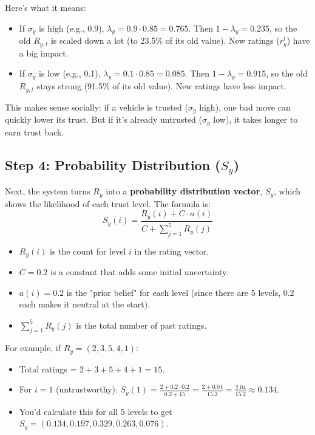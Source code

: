 \documentclass{article}
\begin{document}
Here's what it means:
\begin{itemize}
    \item If \(\sigma_y\) is high (e.g., 0.9), \(\lambda_y = 0.9 \cdot 0.85 = 0.765\). Then \(1 - \lambda_y = 0.235\), so the old \(R_{y,t}\) is scaled down a lot (to 23.5\% of its old value). New ratings (\(r_y^t\)) have a big impact.
    \item If \(\sigma_y\) is low (e.g., 0.1), \(\lambda_y = 0.1 \cdot 0.85 = 0.085\). Then \(1 - \lambda_y = 0.915\), so the old \(R_{y,t}\) stays strong (91.5\% of its old value). New ratings have less impact.
\end{itemize}

This makes sense socially: if a vehicle is trusted (\(\sigma_y\) high), one bad move can quickly lower its trust. But if it's already untrusted (\(\sigma_y\) low), it takes longer to earn trust back.

\subsection*{Step 4: Probability Distribution (\(S_y\))}
Next, the system turns \(R_y\) into a \textbf{probability distribution vector}, \(S_y\), which shows the likelihood of each trust level. The formula is:
\[
S_y(i) = \frac{R_y(i) + C \cdot a(i)}{C + \sum_{j=1}^5 R_y(j)}
\]
\begin{itemize}
    \item \(R_y(i)\) is the count for level \(i\) in the rating vector.
    \item \(C = 0.2\) is a constant that adds some initial uncertainty.
    \item \(a(i) = 0.2\) is the "prior belief" for each level (since there are 5 levels, 0.2 each makes it neutral at the start).
    \item \(\sum_{j=1}^5 R_y(j)\) is the total number of past ratings.
\end{itemize}

For example, if \(R_y = (2, 3, 5, 4, 1)\):
\begin{itemize}
    \item Total ratings = \(2 + 3 + 5 + 4 + 1 = 15\).
    \item For \(i = 1\) (untrustworthy): \( S_y(1) = \frac{2 + 0.2 \cdot 0.2}{0.2 + 15} = \frac{2 + 0.04}{15.2} = \frac{2.04}{15.2} \approx 0.134 \).
    \item You'd calculate this for all 5 levels to get \(S_y = (0.134, 0.197, 0.329, 0.263, 0.076)\).
\end{itemize}
\end{document}
